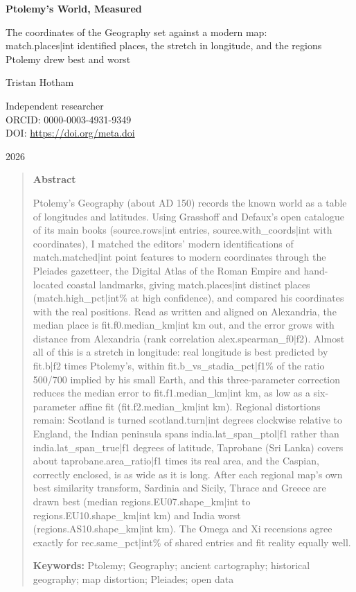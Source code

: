 \documentclass[11pt,a4paper]{article}
\begin{document}
\begin{center}
{\Large\bfseries Ptolemy's World, Measured\par}
\vspace{0.4em}
{\large The coordinates of the Geography set against a modern map:\\{{match.places|int}} identified places, the stretch in longitude, and the regions Ptolemy drew best and worst\par}
\vspace{1.2em}
{\large Tristan Hotham\par}
\vspace{0.3em}
{\small Independent researcher\\
ORCID: 0000-0003-4931-9349\\
DOI: \href{https://doi.org/{{meta.doi}}}{https://doi.org/{{meta.doi}}}\par}
\vspace{0.8em}
2026
\end{center}

\begin{quote}
\small
\begin{center}\textbf{Abstract}\end{center}
Ptolemy's Geography (about AD 150) records the known world as a table of longitudes and latitudes. Using Grasshoff and Defaux's open catalogue of its main books ({{source.rows|int}} entries, {{source.with_coords|int}} with coordinates), I matched the editors' modern identifications of {{match.matched|int}} point features to modern coordinates through the Pleiades gazetteer, the Digital Atlas of the Roman Empire and hand-located coastal landmarks, giving {{match.places|int}} distinct places ({{match.high_pct|int}}\% at high confidence), and compared his coordinates with the real positions. Read as written and aligned on Alexandria, the median place is {{fit.f0.median_km|int}} km out, and the error grows with distance from Alexandria (rank correlation {{alex.spearman_f0|f2}}). Almost all of this is a stretch in longitude: real longitude is best predicted by {{fit.b|f2}} times Ptolemy's, within {{fit.b_vs_stadia_pct|f1}}\% of the ratio 500/700 implied by his small Earth, and this three-parameter correction reduces the median error to {{fit.f1.median_km|int}} km, as low as a six-parameter affine fit ({{fit.f2.median_km|int}} km). Regional distortions remain: Scotland is turned {{scotland.turn|int}} degrees clockwise relative to England, the Indian peninsula spans {{india.lat_span_ptol|f1}} rather than {{india.lat_span_true|f1}} degrees of latitude, Taprobane (Sri Lanka) covers about {{taprobane.area_ratio|f1}} times its real area, and the Caspian, correctly enclosed, is as wide as it is long. After each regional map's own best similarity transform, Sardinia and Sicily, Thrace and Greece are drawn best (median {{regions.EU07.shape_km|int}} to {{regions.EU10.shape_km|int}} km) and India worst ({{regions.AS10.shape_km|int}} km). The Omega and Xi recensions agree exactly for {{rec.same_pct|int}}\% of shared entries and fit reality equally well.

\textbf{Keywords:} Ptolemy; Geography; ancient cartography; historical geography; map distortion; Pleiades; open data
\end{quote}
\end{document}

